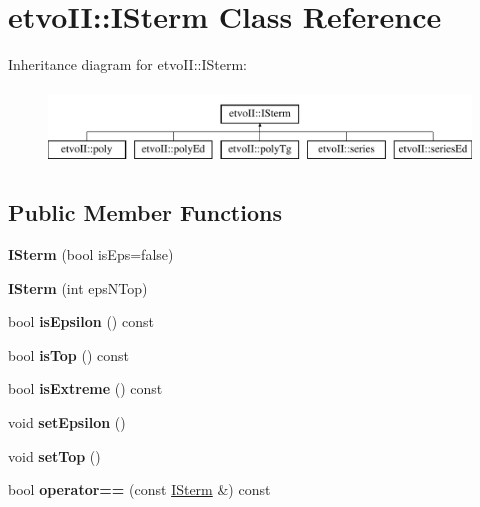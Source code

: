 \hypertarget{classetvo_i_i_1_1_i_sterm}{}\section{etvo\+II\+:\+:I\+Sterm Class Reference}
\label{classetvo_i_i_1_1_i_sterm}
Inheritance diagram for etvo\+II\+:\+:I\+Sterm\+:\begin{figure}[H]
\begin{center}
\leavevmode
\includegraphics[height=2.000000cm]{classetvo_i_i_1_1_i_sterm}
\end{center}
\end{figure}
\subsection*{Public Member Functions}
\begin{DoxyCompactItemize}
\item 
\mbox{\label{classetvo_i_i_1_1_i_sterm_ae20fb601c918123c4104eb2fc66af135}} 
{\bfseries I\+Sterm} (bool is\+Eps=false)
\item 
\mbox{\label{classetvo_i_i_1_1_i_sterm_a6b4c1cdbfc9094f7b632260819bba7c0}} 
{\bfseries I\+Sterm} (int eps\+N\+Top)
\item 
\mbox{\label{classetvo_i_i_1_1_i_sterm_a481c4e2f89e3f307be7aa7eae65397a9}} 
bool {\bfseries is\+Epsilon} () const
\item 
\mbox{\label{classetvo_i_i_1_1_i_sterm_a5fb872b3ae656e25ee9f68c2b96cf524}} 
bool {\bfseries is\+Top} () const
\item 
\mbox{\label{classetvo_i_i_1_1_i_sterm_a76e43c393922a60ce672b52a330cc63c}} 
bool {\bfseries is\+Extreme} () const
\item 
\mbox{\label{classetvo_i_i_1_1_i_sterm_ad436ef0e1f87ba54aab78ea063b00b91}} 
void {\bfseries set\+Epsilon} ()
\item 
\mbox{\label{classetvo_i_i_1_1_i_sterm_afe55cf508a2e5a64da6f3b1985252d1a}} 
void {\bfseries set\+Top} ()
\item 
\mbox{\label{classetvo_i_i_1_1_i_sterm_a197edd8fc2eb74ee93a6abeeb2f4cd96}} 
bool {\bfseries operator==} (const \mbox{\hyperlink{classetvo_i_i_1_1_i_sterm}{I\+Sterm}} \&) const
\end{DoxyCompactItemize}
